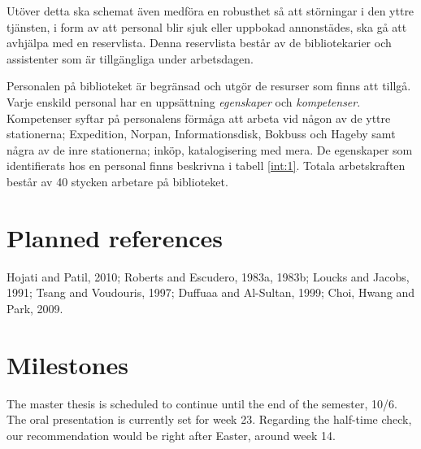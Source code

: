 \documentclass{article}
\begin{document}
Utöver detta ska schemat även medföra en robusthet så att störningar i den yttre tjänsten, i form av att personal blir sjuk eller uppbokad annonstädes, ska gå att avhjälpa med en reservlista. Denna reservlista består av de bibliotekarier och assistenter som är tillgängliga under arbetsdagen. 

Personalen på biblioteket är begränsad och utgör de resurser som finns att tillgå. Varje enskild personal har en uppsättning \textit{egenskaper} och \textit{kompetenser}. Kompetenser syftar på personalens förmåga att arbeta vid någon av de yttre stationerna; Expedition, Norpan, Informationsdisk, Bokbuss och Hageby samt några av de inre stationerna; inköp, katalogisering med mera. De egenskaper som identifierats hos en personal finns beskrivna i tabell \ref{int:1}. Totala arbetskraften består av 40 stycken arbetare på biblioteket.
\fi
\pagebreak
\section*{Planned references}
Hojati and Patil, 2010; Roberts and Escudero, 1983a, 1983b; Loucks and Jacobs, 1991; Tsang and Voudouris, 1997; Duffuaa and Al-Sultan, 1999; Choi, Hwang and Park, 2009.

\section*{Milestones}
The master thesis is scheduled to continue until the end of the semester, 10/6. The oral presentation is currently set for week 23. Regarding the half-time check, our recommendation would be right after Easter, around week 14.
\end{document}
